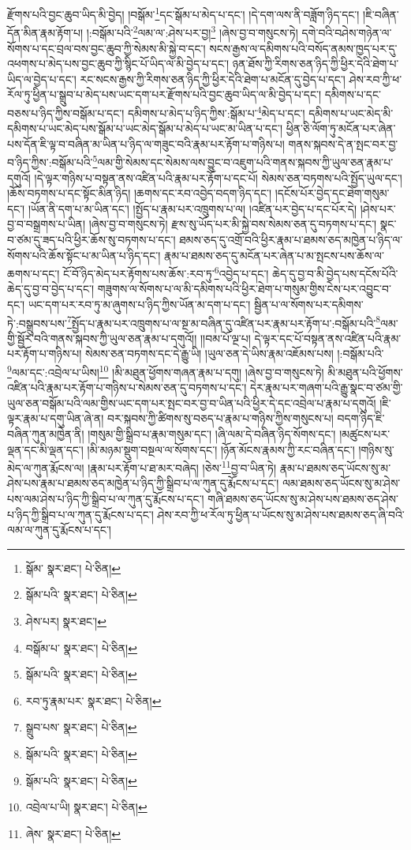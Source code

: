 རྫོགས་པའི་བྱང་ཆུབ་ཡིད་མི་བྱེད། །བསྒོམ་\footnote{སྒོམ་  སྣར་ཐང་།  པེ་ཅིན། }དང་སྒོམ་པ་མེད་པ་དང་། །དེ་དག་ལས་ནི་བཟློག་ཉིད་དང་། །ཇི་བཞིན་དོན་མིན་རྣམ་རྟོག་པ། །:བསྒོམ་པའི་\footnote{སྒོམ་པའི་  སྣར་ཐང་།  པེ་ཅིན། }ལམ་ལ་:ཤེས་པར་བྱ།\footnote{ཤེས་པར།  སྣར་ཐང་། } །ཞེས་བྱ་བ་གསུངས་ཏེ། དགེ་བའི་བཤེས་གཉེན་ལ་སོགས་པ་དང་བྲལ་བས་བྱང་ཆུབ་ཀྱི་སེམས་མི་སྐྱེ་བ་དང་། སངས་རྒྱས་ལ་དམིགས་པའི་བསོད་ནམས་ཁྱད་པར་དུ་འཕགས་པ་མེད་པས་བྱང་ཆུབ་ཀྱི་སྙིང་པོ་ཡིད་ལ་མི་བྱེད་པ་དང་། ཉན་ཐོས་ཀྱི་རིགས་ཅན་ཉིད་ཀྱི་ཕྱིར་དེའི་ཐེག་པ་ཡིད་ལ་བྱེད་པ་དང་། རང་སངས་རྒྱས་ཀྱི་རིགས་ཅན་ཉིད་ཀྱི་ཕྱིར་དེའི་ཐེག་པ་མངོན་དུ་བྱེད་པ་དང་། ཤེས་རབ་ཀྱི་ཕ་རོལ་ཏུ་ཕྱིན་པ་སྒྲུབ་པ་མེད་པས་ཡང་དག་པར་རྫོགས་པའི་བྱང་ཆུབ་ཡིད་ལ་མི་བྱེད་པ་དང་། དམིགས་པ་དང་བཅས་པ་ཉིད་ཀྱིས་བསྒོམ་པ་དང་། དམིགས་པ་མེད་པ་ཉིད་ཀྱིས་:སྒོམ་པ་\footnote{བསྒོམ་པ་  སྣར་ཐང་།  པེ་ཅིན། }མེད་པ་དང་། དམིགས་པ་ཡང་མེད་མི་དམིགས་པ་ཡང་མེད་པས་སྒོམ་པ་ཡང་མེད་སྒོམ་པ་མེད་པ་ཡང་མ་ཡིན་པ་དང་། ཕྱིན་ཅི་ལོག་ཏུ་མངོན་པར་ཞེན་པས་དོན་ཇི་ལྟ་བ་བཞིན་མ་ཡིན་པ་ཉིད་ལ་གཟུང་བའི་རྣམ་པར་རྟོག་པ་གཉིས་པ། གནས་སྐབས་དེ་ན་སྤང་བར་བྱ་བ་ཉིད་ཀྱིས་:བསྒོམ་པའི་\footnote{སྒོམ་པའི་  སྣར་ཐང་།  པེ་ཅིན། }ལམ་གྱི་སེམས་དང་སེམས་ལས་བྱུང་བ་འཇུག་པའི་གནས་སྐབས་ཀྱི་ཡུལ་ཅན་རྣམ་པ་དགུའོ། །དེ་ལྟར་གཉིས་པ་བསྟན་ནས་འཛིན་པའི་རྣམ་པར་རྟོག་པ་དང་པོ། སེམས་ཅན་བཏགས་པའི་སྤྱོད་ཡུལ་དང་། །ཆོས་བཏགས་པ་དང་སྟོང་མིན་ཉིད། །ཆགས་དང་རབ་འབྱེད་བདག་ཉིད་དང་། །དངོས་པོར་བྱེད་དང་ཐེག་གསུམ་དང་། །ཡོན་ནི་དག་པ་མ་ཡིན་དང་། །སྤྱོད་པ་རྣམ་པར་འཁྲུགས་པ་ལ། །འཛིན་པར་བྱེད་པ་དང་པོར་དེ། །ཤེས་པར་བྱ་བ་བསྒྲགས་པ་ཡིན། །ཞེས་བྱ་བ་གསུངས་ཏེ། རྫས་སུ་ཡོད་པར་མི་སྐྱེ་བས་སེམས་ཅན་དུ་བཏགས་པ་དང་། སྣང་བ་ཙམ་དུ་ཟད་པའི་ཕྱིར་ཆོས་སུ་བཏགས་པ་དང་། ཐམས་ཅད་དུ་འགྲོ་བའི་ཕྱིར་རྣམ་པ་ཐམས་ཅད་མཁྱེན་པ་ཉིད་ལ་སོགས་པའི་ཆོས་སྟོང་པ་མ་ཡིན་པ་ཉིད་དང་། རྣམ་པ་ཐམས་ཅད་དུ་མངོན་པར་ཞེན་པ་མ་སྤངས་པས་ཆོས་ལ་ཆགས་པ་དང་། ངོ་བོ་ཉིད་མེད་པར་རྟོགས་པས་ཆོས་:རབ་ཏུ་\footnote{རབ་ཏུ་རྣམ་པར་  སྣར་ཐང་།  པེ་ཅིན། }འབྱེད་པ་དང་། ཆེད་དུ་བྱ་བ་མི་བྱེད་པས་དངོས་པོའི་ཆེད་དུ་བྱ་བ་བྱེད་པ་དང་། གཟུགས་ལ་སོགས་པ་ལ་མི་དམིགས་པའི་ཕྱིར་ཐེག་པ་གསུམ་གྱིས་ངེས་པར་འབྱུང་བ་དང་། ཡང་དག་པར་རབ་ཏུ་མ་ཞུགས་པ་ཉིད་ཀྱིས་ཡོན་མ་དག་པ་དང་། སྦྱིན་པ་ལ་སོགས་པར་དམིགས་ཏེ་:བསྒྲུབས་པས་\footnote{སྒྲུབ་པས་  སྣར་ཐང་།  པེ་ཅིན། }སྤྱོད་པ་རྣམ་པར་འཁྲུགས་པ་ལ་སྔ་མ་བཞིན་དུ་འཛིན་པར་རྣམ་པར་རྟོག་པ་:བསྒོམ་པའི་\footnote{སྒོམ་པའི་  སྣར་ཐང་།  པེ་ཅིན། }ལམ་གྱི་སྦྱོར་བའི་གནས་སྐབས་ཀྱི་ཡུལ་ཅན་རྣམ་པ་དགུའོ།། །།བམ་པོ་ལྔ་པ། དེ་ལྟར་དང་པོ་བསྟན་ནས་འཛིན་པའི་རྣམ་པར་རྟོག་པ་གཉིས་པ། སེམས་ཅན་བཏགས་དང་དེ་རྒྱུ་ཡི། །ཡུལ་ཅན་དེ་ཡིས་རྣམ་འཇོམས་པས། །:བསྒོམ་པའི་\footnote{སྒོམ་པའི་  སྣར་ཐང་།  པེ་ཅིན། }ལམ་དང་:འབྲེལ་པ་ཡིས།\footnote{འབྲེལ་པ་ཡི།  སྣར་ཐང་།  པེ་ཅིན། } །མི་མཐུན་ཕྱོགས་གཞན་རྣམ་པ་དགུ། །ཞེས་བྱ་བ་གསུངས་ཏེ། མི་མཐུན་པའི་ཕྱོགས་འཛིན་པའི་རྣམ་པར་རྟོག་པ་གཉིས་པ་སེམས་ཅན་དུ་བཏགས་པ་དང་། དེར་རྣམ་པར་གཞག་པའི་རྒྱུ་སྣང་བ་ཙམ་གྱི་ཡུལ་ཅན་བསྒོམ་པའི་ལམ་གྱིས་ཡང་དག་པར་སྤང་བར་བྱ་བ་ཡིན་པའི་ཕྱིར་དེ་དང་འབྲེལ་པ་རྣམ་པ་དགུའོ། །ཇི་ལྟར་རྣམ་པ་དགུ་ཡིན་ཞེ་ན། བར་སྐབས་ཀྱི་ཚིགས་སུ་བཅད་པ་རྣམ་པ་གཉིས་ཀྱིས་གསུངས་པ། བདག་ཉིད་ཇི་བཞིན་ཀུན་མཁྱེན་ནི། །གསུམ་གྱི་སྒྲིབ་པ་རྣམ་གསུམ་དང་། །ཞི་ལམ་དེ་བཞིན་ཉིད་སོགས་དང་། །མཚུངས་པར་ལྡན་དང་མི་ལྡན་དང་། །མི་མཉམ་སྡུག་བསྔལ་ལ་སོགས་དང་། །ཉོན་མོངས་རྣམས་ཀྱི་རང་བཞིན་དང་། །གཉིས་སུ་མེད་ལ་ཀུན་རྨོངས་ལ། །རྣམ་པར་རྟོག་པ་ཐ་མར་བཞེད། །ཅེས་\footnote{ཞེས་  སྣར་ཐང་།  པེ་ཅིན། }བྱ་བ་ཡིན་ཏེ། རྣམ་པ་ཐམས་ཅད་ཡོངས་སུ་མ་ཤེས་པས་རྣམ་པ་ཐམས་ཅད་མཁྱེན་པ་ཉིད་ཀྱི་སྒྲིབ་པ་ལ་ཀུན་དུ་རྨོངས་པ་དང་། ལམ་ཐམས་ཅད་ཡོངས་སུ་མ་ཤེས་པས་ལམ་ཤེས་པ་ཉིད་ཀྱི་སྒྲིབ་པ་ལ་ཀུན་དུ་རྨོངས་པ་དང་། གཞི་ཐམས་ཅད་ཡོངས་སུ་མ་ཤེས་པས་ཐམས་ཅད་ཤེས་པ་ཉིད་ཀྱི་སྒྲིབ་པ་ལ་ཀུན་དུ་རྨོངས་པ་དང་། ཤེས་རབ་ཀྱི་ཕ་རོལ་ཏུ་ཕྱིན་པ་ཡོངས་སུ་མ་ཤེས་པས་ཐམས་ཅད་ཞི་བའི་ལམ་ལ་ཀུན་དུ་རྨོངས་པ་དང་། 